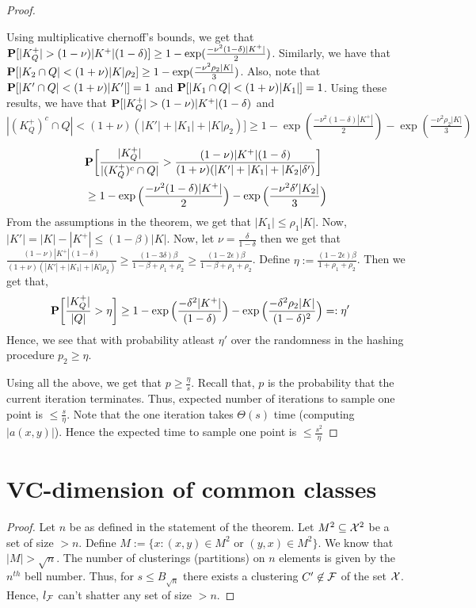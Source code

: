 \begin{proof}
\begin{enumerate}[label=\textbf{T.\arabic*}]
Using multiplicative chernoff's bounds, we get that $\mathbf P[|K_Q^+| > (1-\nu)|K^+|(1-\delta) ] \ge 1 - \exp(\frac{-\nu^2 (1-\delta) |K^+|}{2})$. Similarly, we have that $\mathbf P[|K_2 \cap Q| < (1+\nu)|K| \rho_2] \ge 1 - \exp(\frac{-\nu^2 \rho_2 |K|}{3})$. Also, note that $\mathbf P[|K' \cap Q| < (1+\nu)|K'|] = 1$ and $\mathbf P[|K_1 \cap Q| < (1+\nu)|K_1|] = 1$. Using these results, we have that $\mathbf P[|K_Q^+| > (1-\nu)|K^+|(1-\delta)$ and $|(K^+_Q)^c \cap Q| < (1+\nu)(|K'|+|K_1|+|K|\rho_2)] \ge 1 - \exp(\frac{-\nu^2 (1-\delta) |K^+|}{2}) - \exp(\frac{-\nu^2 \rho_2 |K|}{3})$
\begin{align*}
  &\mathbf P\bigg[\frac{|K^+_Q|}{|(K^+_Q)^c \cap Q|} > \frac{(1-\nu)|K^+|(1-\delta)}{(1+\nu)(|K'|+|K_1|+|K_2|\delta')} \bigg] \\
  &\ge 1 - \exp\Big(\frac{-\nu^2 (1-\delta) |K^+|}{2}\Big) - \exp\Big(\frac{-\nu^2 \delta' |K_2|}{3}\Big)
\end{align*}
From the assumptions in the theorem, we get that $|K_1| \le \rho_1|K|$. Now, $|K'| = |K| - |K^+| \le (1-\beta)|K|$. Now, let $\nu = \frac{\delta}{1-\delta}$ then we get that $\frac{(1-\nu)|K^+|(1-\delta)}{(1+\nu)(|K'|+|K_1|+|K|\rho_2)} \ge \frac{(1-3\delta)\beta}{1-\beta + \rho_1 + \rho_2} \ge \frac{(1-2\epsilon)\beta}{1-\beta + \rho_1 + \rho_2}$. Define $\eta := \frac{(1-2\epsilon)\beta}{1 + \rho_1 + \rho_2}$. Then we get that,
\begin{align*}
  \mathbf P\bigg[\frac{|K^+_Q|}{|Q|} > \eta\bigg] &\ge 1- \exp\Big(\frac{- \delta^2 |K^+|}{(1-\delta)}\Big)- \exp\Big(\frac{-\delta^2\rho_2 |K|}{(1-\delta)^2}\Big) =: \eta'
\end{align*}
Hence, we see that with probability atleast $\eta'$ over the randomness in the hashing procedure $p_2 \ge \eta$.   
\end{enumerate}
Using all the above, we get that $p \ge \frac{\eta}{s}$. Recall that, $p$ is the probability that the current iteration terminates. Thus, expected number of iterations to sample one point is $\le \frac{s}{\eta}$. Note that the one iteration takes $\Theta(s)$ time (computing $|a(x, y)|$). Hence the expected time to sample one point is  $\le \frac{s^2}{\eta}$
\end{proof}

\section{VC-dimension of common classes}
\VCDim*
\begin{proof}
Let $n$ be as defined in the statement of the theorem. Let $M^2 \subseteq \mathcal X^2$ be a set of size $> n$. Define $M := \{x: (x, y) \in M^2 \text{ or } (y, x) \in M^2\}$. We know that $|M| > \sqrt n$. The number of clusterings (partitions) on $n$ elements is given by the $n^{th}$ bell number. Thus, for $s \le B_{\sqrt n}$ there exists a clustering $C' \not\in \mathcal F$ of the set $\mathcal X$. Hence, $l_{\mathcal F}$ can't shatter any set of size $> n$.
\end{proof}

